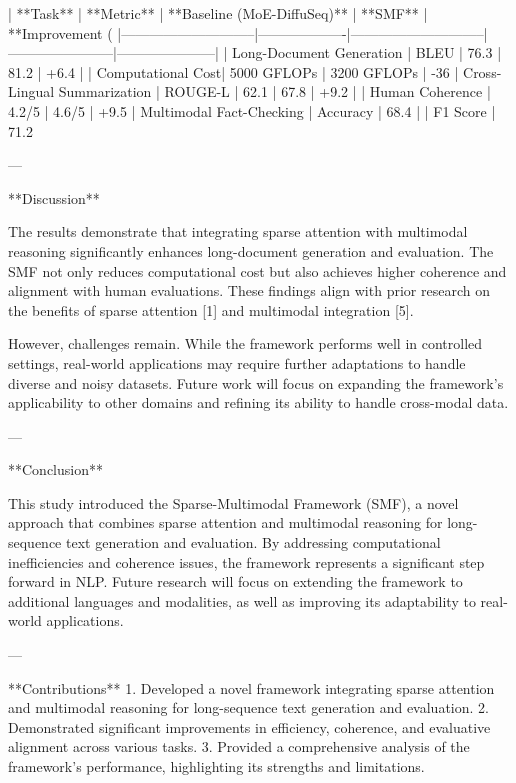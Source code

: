 | **Task**                    | **Metric**         | **Baseline (MoE-DiffuSeq)** | **SMF**               | **Improvement (%
|-----------------------------|-------------------|-----------------------------|-----------------------|---------------------|  
| Long-Document Generation    | BLEU              | 76.3                        | 81.2                  | +6.4%
|                             | Computational Cost| 5000 GFLOPs                 | 3200 GFLOPs           | -36%
| Cross-Lingual Summarization | ROUGE-L           | 62.1                        | 67.8                  | +9.2%
|                             | Human Coherence   | 4.2/5                       | 4.6/5                 | +9.5%
| Multimodal Fact-Checking    | Accuracy          | 68.4%
|                             | F1 Score          | 71.2%

---

**Discussion**  

The results demonstrate that integrating sparse attention with multimodal reasoning significantly enhances long-document generation and evaluation. The SMF not only reduces computational cost but also achieves higher coherence and alignment with human evaluations. These findings align with prior research on the benefits of sparse attention [1] and multimodal integration [5].  

However, challenges remain. While the framework performs well in controlled settings, real-world applications may require further adaptations to handle diverse and noisy datasets. Future work will focus on expanding the framework's applicability to other domains and refining its ability to handle cross-modal data.  

---

**Conclusion**  

This study introduced the Sparse-Multimodal Framework (SMF), a novel approach that combines sparse attention and multimodal reasoning for long-sequence text generation and evaluation. By addressing computational inefficiencies and coherence issues, the framework represents a significant step forward in NLP. Future research will focus on extending the framework to additional languages and modalities, as well as improving its adaptability to real-world applications.

---

**Contributions**  
1. Developed a novel framework integrating sparse attention and multimodal reasoning for long-sequence text generation and evaluation.  
2. Demonstrated significant improvements in efficiency, coherence, and evaluative alignment across various tasks.  
3. Provided a comprehensive analysis of the framework's performance, highlighting its strengths and limitations.  

